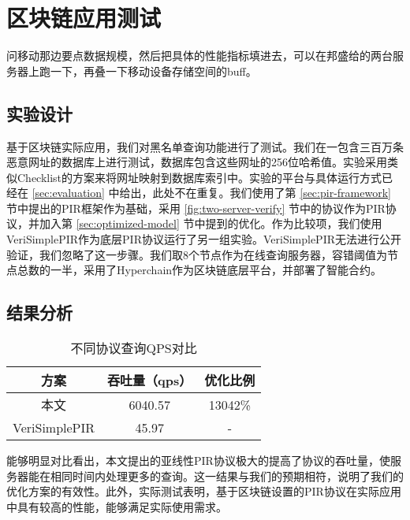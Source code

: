 \section{区块链应用测试}

{问移动那边要点数据规模，然后把具体的性能指标填进去，可以在邦盛给的两台服务器上跑一下，再叠一下移动设备存储空间的buff。}
\subsection{实验设计}
基于区块链实际应用，我们对黑名单查询功能进行了测试。我们在一包含三百万条恶意网址的数据库上进行测试，数据库包含这些网址的256位哈希值。实验采用类似Checklist\cite{Checklist}的方案来将网址映射到数据库索引中。实验的平台与具体运行方式已经在 \ref{sec:evaluation} 中给出，此处不在重复。我们使用了第 \ref{sec:pir-framework} 节中提出的PIR框架作为基础，采用 \ref{fig:two-server-verify} 节中的协议作为PIR协议，并加入第 \ref{sec:optimized-model} 节中提到的优化。作为比较项，我们使用VeriSimplePIR\cite{VeriSimplePIR}作为底层PIR协议运行了另一组实验。VeriSimplePIR无法进行公开验证，我们忽略了这一步骤。我们取8个节点作为在线查询服务器，容错阈值为节点总数的一半，采用了Hyperchain\cite{hyperchain}作为区块链底层平台，并部署了智能合约。

\subsection{结果分析}
\begin{table}[]
    \caption{不同协议查询QPS对比}
    \centering
    \label{tab:blockchain-query-qps}
    \begin{tabular}{@{}c|c|c@{}}
    \toprule
    方案            & 吞吐量（qps） & 优化比例    \\ \midrule
    本文            & 6040.57  & 13042\% \\
    VeriSimplePIR & 45.97    & -       \\ \bottomrule
    \end{tabular}
\end{table}

能够明显对比看出，本文提出的亚线性PIR协议极大的提高了协议的吞吐量，使服务器能在相同时间内处理更多的查询。这一结果与我们的预期相符，说明了我们的优化方案的有效性。此外，实际测试表明，基于区块链设置的PIR协议在实际应用中具有较高的性能，能够满足实际使用需求。